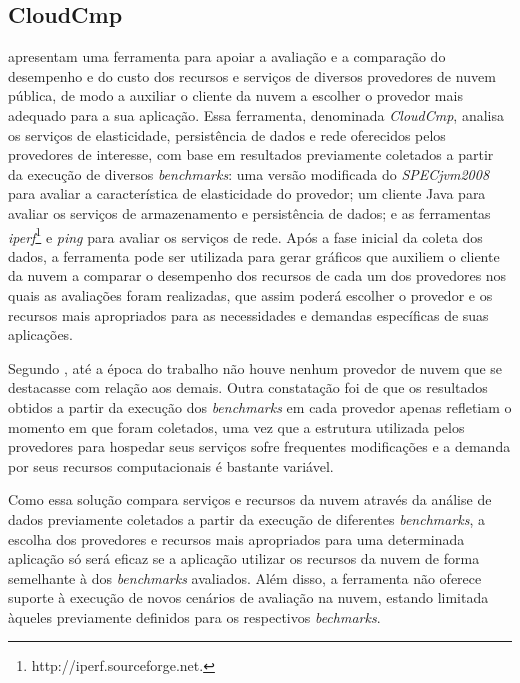 \subsection{CloudCmp}
 apresentam uma ferramenta para apoiar a avaliação e a comparação do
desempenho e do custo dos recursos e serviços de diversos provedores de nuvem
pública, de modo a auxiliar o cliente da nuvem a escolher o provedor mais adequado para a sua
aplicação. Essa ferramenta, denominada {\em CloudCmp}, analisa
os serviços de elasticidade, persistência de dados e rede oferecidos pelos provedores
de interesse, com base em resultados previamente coletados a partir da execução de diversos
{\em benchmarks}: uma versão modificada do {\em SPECjvm2008}~\cite{SPECjvm2008}
para avaliar a característica de elasticidade do provedor; um cliente Java para avaliar os serviços de
armazenamento e persistência de dados; e as ferramentas {\em iperf}\footnote{http://iperf.sourceforge.net. }
e {\em ping} para avaliar os serviços de rede. Após a fase inicial da coleta dos dados, a ferramenta pode ser utilizada para gerar gráficos que auxiliem o
cliente da nuvem a comparar o desempenho dos recursos de cada um
dos provedores nos quais as avaliações foram realizadas, que assim poderá escolher o provedor e os recursos mais apropriados para as necessidades e demandas específicas de suas aplicações. 


Segundo , até a época do trabalho não houve
nenhum provedor de nuvem que se destacasse com relação aos demais. Outra constatação foi de que os resultados
obtidos a partir da execução dos {\em benchmarks} em cada provedor apenas refletiam o momento em que foram coletados, uma vez que a estrutura utilizada pelos provedores para hospedar seus serviços sofre frequentes modificações e a demanda por seus recursos computacionais é bastante variável.

Como essa solução compara serviços e recursos da nuvem através da análise de dados
previamente coletados a partir da execução de diferentes {\em benchmarks}, a
escolha dos provedores e recursos mais apropriados para uma determinada aplicação só será eficaz se a aplicação utilizar os recursos da nuvem de forma semelhante à dos {\em benchmarks} avaliados. Além disso, a
ferramenta não oferece suporte à execução de novos cenários de avaliação na nuvem, estando limitada àqueles previamente definidos para os respectivos {\em bechmarks}.

